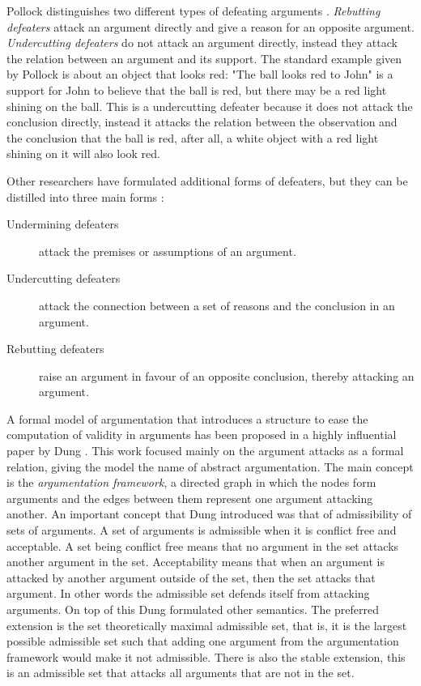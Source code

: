 \documentclass[a4paper]{article}
\begin{document}
Pollock distinguishes two different types of defeating arguments
\cite{pollock1995}. \emph{Rebutting defeaters} attack an argument directly and
give a reason for an opposite argument. \emph{Undercutting defeaters} do not
attack an argument directly, instead they attack the relation between an
argument and its support. The standard example given by Pollock is about an
object that looks red: "The ball looks red to John" is a support for John to
believe that the ball is red, but there may be a red light shining on the ball.
This is a undercutting defeater because it does not attack the conclusion
directly, instead it attacks the relation between the observation and the
conclusion that the ball is red, after all, a white object with a red light
shining on it will also look red.

Other researchers have formulated additional forms of defeaters, but they can
be distilled into three main forms \cite{vaneemeren2014}:
\begin{description}
	\item[Undermining defeaters] attack the premises or assumptions of an
	argument.
	\item[Undercutting defeaters] attack the connection between a set of
	reasons and the conclusion in an argument.
	\item[Rebutting defeaters] raise an argument in favour of an opposite
	conclusion, thereby attacking an argument.
\end{description}

A formal model of argumentation that introduces a structure to ease the
computation of validity in arguments has been proposed in a highly influential
paper by Dung \cite{dung1995}. This work focused mainly on the argument attacks
as a formal relation, giving the model the name of abstract argumentation. The
main concept is the \emph{argumentation framework}, a directed graph in which
the nodes form arguments and the edges between them represent one argument
attacking another. An important concept that Dung introduced was that of
admissibility of sets of arguments. A set of arguments is admissible when it is
conflict free and acceptable. A set being conflict free means that no argument
in the set attacks another argument in the set. Acceptability means that when
an argument is attacked by another argument outside of the set, then the set
attacks that argument. In other words the admissible set defends itself from
attacking arguments. On top of this Dung formulated other semantics. The
preferred extension is the set theoretically maximal admissible set, that is,
it is the largest possible admissible set such that adding one argument from
the argumentation framework would make it not admissible. There is also the
stable extension, this is an admissible set that attacks all arguments that are
not in the set.
\end{document}
